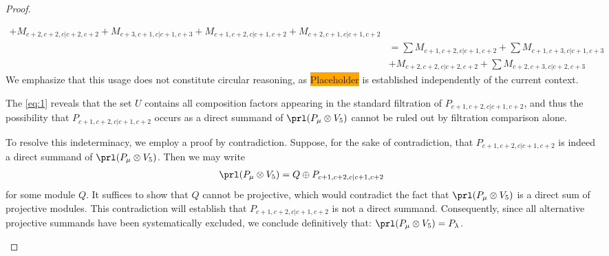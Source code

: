 \begin{proof}
\begin{enumerate}
\begin{enumerate}
\begin{equation}
\begin{aligned}
+M_{c+2,c+2,c|c+2,c+2}
+M_{c+3,c+1,c|c+1,c+3}
+M_{c+1,c+2,c|c+1,c+2}
+M_{c+2,c+1,c|c+1,c+2} \\
                          &=
\sum M_{c+1,c+2,c|c+1,c+2}
+\sum M_{c+1,c+3,c|c+1,c+3}\\
                                              &
+ M_{c+2,c+2,c|c+2,c+2}
+\sum M_{c+2,c+3,c|c+2,c+3}    
  \end{aligned}
\end{equation}
We emphasize that this usage does not constitute circular reasoning, as \colorbox{orange}{Placeholder} is established independently of the current context.

The \cref{eq:1} reveals that the set $U$ contains all composition factors appearing in the standard filtration of $P_{c+1,c+2,c|c+1,c+2}$, and thus the possibility that $P_{c+1,c+2,c|c+1,c+2}$ occurs as a direct summand of $\prl(P_\mu \otimes V_5)$ cannot be ruled out by filtration comparison alone.

To resolve this indeterminacy, we employ a proof by contradiction. Suppose, for the sake of contradiction, that $P_{c+1,c+2,c|c+1,c+2}$ is indeed a direct summand of $\prl(P_\mu \otimes V_5)$. Then we may write
\begin{equation}\notag
  \begin{aligned}
\prl(P_\mu \otimes V_5) = Q \oplus P_{c+1,c+2,c|c+1,c+2}
  \end{aligned}
\end{equation}
for some module $Q$. It suffices to show that $Q$ cannot be projective, which would contradict the fact that $\prl(P_\mu \otimes V_5)$ is a direct sum of projective modules. This contradiction will establish that $P_{c+1,c+2,c|c+1,c+2}$ is not a direct summand. Consequently, since all alternative projective summands have been systematically excluded, we conclude definitively that: $\prl(P_\mu \otimes V_5) = P_\lambda$.


\end{enumerate}
\end{enumerate}
\end{proof}
